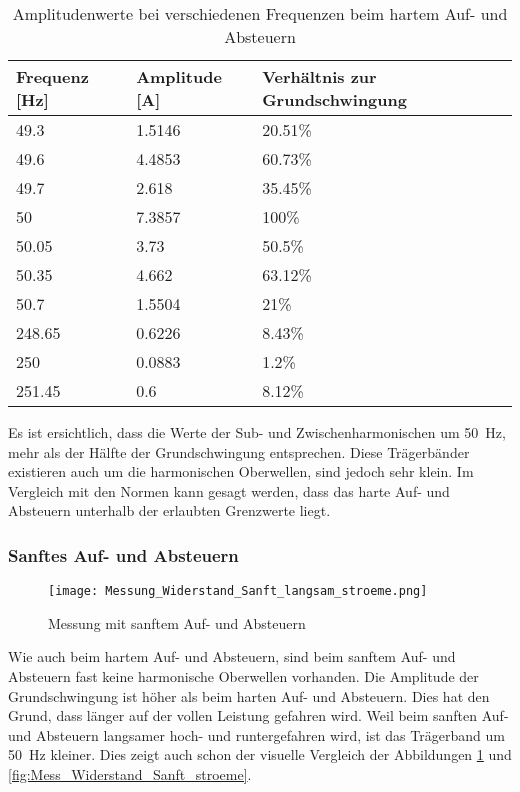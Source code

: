 \begin{table}[ht!]
	\centering
	\begin{tabular}{|l|l|l|}
		\hline
		Frequenz {[}Hz{]} & Amplitude {[}A{]} & Verhältnis zur Grundschwingung	\\ \hline
		49.3              & 1.5146            & 20.51\%							\\ \hline
		49.6              & 4.4853            & 60.73\%							\\ \hline
		49.7              & 2.618             & 35.45\%							\\ \hline
		50                & 7.3857            & 100\%							\\ \hline
		50.05             & 3.73              & 50.5\%							\\ \hline
		50.35             & 4.662             & 63.12\%							\\ \hline
		50.7              & 1.5504            & 21\%							\\ \hline
		248.65            & 0.6226            & 8.43\%							\\ \hline
		250               & 0.0883            & 1.2\%							\\ \hline
		251.45            & 0.6               & 8.12\%							\\ \hline
	\end{tabular}
	\caption{Amplitudenwerte bei verschiedenen Frequenzen beim hartem Auf- und Absteuern}\label{tab:Sanft_stroeme}
\end{table}

Es ist ersichtlich, dass die Werte der Sub- und Zwischenharmonischen um \SI{50}{Hz}, mehr als der Hälfte der Grundschwingung entsprechen. Diese Trägerbänder existieren auch um die harmonischen Oberwellen, sind jedoch sehr klein. Im Vergleich mit den Normen kann gesagt werden, dass das harte Auf- und Absteuern unterhalb der erlaubten Grenzwerte liegt.


\newpage
\subsubsection*{Sanftes Auf- und Absteuern}\label{sec:Sanft_Widerstand_stroeme}
\begin{figure}[ht!]
	\centering
	\texttt{[image: Messung\_Widerstand\_Sanft\_langsam\_stroeme.png]}	
	\caption{Messung mit sanftem Auf- und Absteuern}\label{fig:Mess_Widerstand_Sanft_langsam_stroeme}
\end{figure}

Wie auch beim hartem Auf- und Absteuern, sind beim sanftem Auf- und Absteuern fast keine harmonische Oberwellen vorhanden. Die Amplitude der Grundschwingung ist höher als beim harten Auf- und Absteuern. Dies hat den Grund, dass länger auf der vollen Leistung gefahren wird. Weil beim sanften Auf- und Absteuern langsamer hoch- und runtergefahren wird, ist das Trägerband um \SI{50}{Hz} kleiner. Dies zeigt auch schon der visuelle Vergleich der Abbildungen \ref{fig:Mess_Widerstand_Sanft_langsam_stroeme} und \ref{fig:Mess_Widerstand_Sanft_stroeme}.

